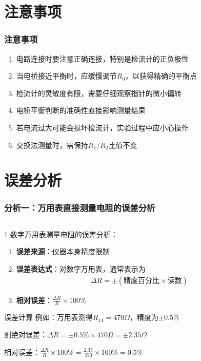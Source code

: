 \documentclass{beamer}
\begin{document}
	\section{注意事项}

	\begin{frame}
		\frametitle{注意事项}
		
		\begin{enumerate}
			\item 电路连接时要注意正确连接，特别是检流计的正负极性
			\item 当电桥接近平衡时，应缓慢调节$R_0$，以获得精确的平衡点
			\item 检流计的灵敏度有限，需要仔细观察指针的微小偏转
			\item 电桥平衡判断的准确性直接影响测量结果
			\item 若电流过大可能会损坏检流计，实验过程中应小心操作
			\item 交换法测量时，需保持$R_1/R_2$比值不变
		\end{enumerate}
		
	\end{frame}

	\section{误差分析}

	\begin{frame}
		\frametitle{分析一：万用表直接测量电阻的误差分析}
		
		\begin{columns}
			\begin{column}{1\textwidth}
				数字万用表测量电阻的误差分析：
				\begin{enumerate}
					\item \textbf{误差来源}：仪器本身精度限制
					\item \textbf{误差表达式}：对数字万用表，通常表示为
						\begin{align}
							\Delta R = \pm(\text{精度百分比} \times \text{读数})
						\end{align}
					\item \textbf{相对误差}：$\frac{\Delta R}{R} \times 100\%$
				\end{enumerate}
				
				\begin{alertblock}{误差计算}
					例如：万用表测得$R_{x1} = 470\Omega$，精度为$\pm 0.5\%$
					
					则绝对误差：$\Delta R = \pm 0.5\% \times 470\Omega = \pm 2.35\Omega$
					
					相对误差：$\frac{\Delta R}{R} \times 100\% = \frac{2.35}{470} \times 100\% = 0.5\%$
				\end{alertblock}
			\end{column}
		\end{columns}
	\end{frame}
	
\end{document}
